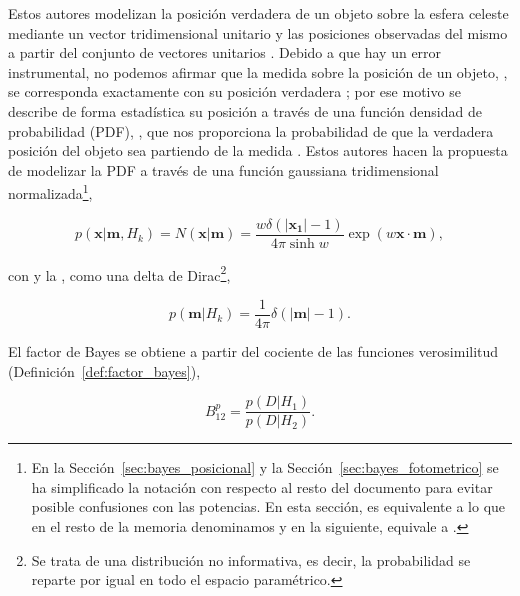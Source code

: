 Estos autores modelizan la posición verdadera de un objeto sobre la esfera celeste mediante un vector tridimensional unitario  y las posiciones observadas del mismo a partir del conjunto de vectores unitarios  . 
Debido a que hay un error instrumental, no podemos afirmar que la medida sobre la posición de un objeto, , se corresponda exactamente con su posición verdadera ; por ese motivo se describe de forma estadística su posición a través de una función densidad de probabilidad (PDF), , que nos proporciona la probabilidad de que la verdadera posición del objeto sea  partiendo de la medida . Estos autores hacen la propuesta de modelizar la PDF a través de una función gaussiana tridimensional normalizada\footnote{En la Sección~\ref{sec:bayes_posicional} y la Sección~\ref{sec:bayes_fotometrico} se ha simplificado la notación con respecto al resto del documento para evitar posible confusiones con las potencias. En esta sección, \maths{\sigma} es equivalente a lo que en el resto de la memoria denominamos  y en la siguiente, \maths{\sigma} equivale a .}, 

\begin{equation*}
    p(\boldsymbol{x}|\boldsymbol{m},H_k)=N(\boldsymbol{x}|\boldsymbol{m})=\frac{w \delta (\left|\boldsymbol{x_1} \right|-1)}{4\pi \sinh{w}} \exp{(w \boldsymbol{x}\cdot \boldsymbol{m})},
\end{equation*}

con  y la  , como una delta de Dirac\footnote{Se trata de una distribución no informativa, es decir, la probabilidad se reparte por igual en todo el espacio paramétrico.},

\begin{equation}\label{eq:delta}
    p(\boldsymbol{m}|H_k)=\frac{1}{4\pi} \delta (\left|\boldsymbol{m} \right|-1).
\end{equation}

El factor de Bayes se obtiene a partir del cociente de las funciones verosimilitud (Definición~\ref{def:factor_bayes}),

\begin{equation}\label{eq:f_bayes_posicional}
    B^{p}_{12}=\frac{p(D|H_1)}{p(D|H_2)}.
\end{equation}

